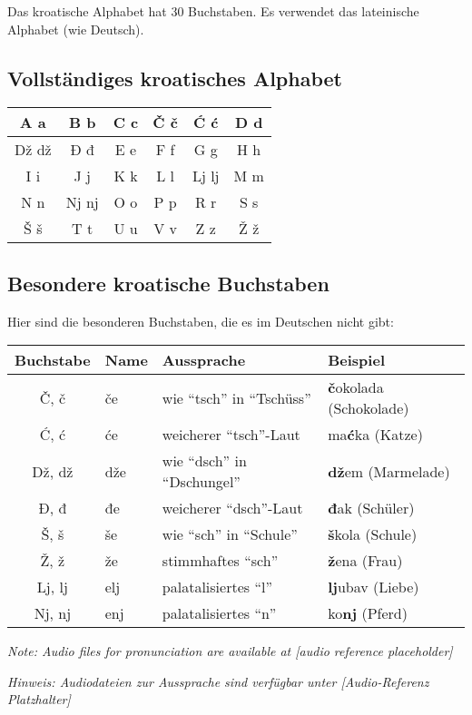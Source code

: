 \begin{vocabulary}
Das kroatische Alphabet hat 30 Buchstaben. Es verwendet das lateinische Alphabet (wie Deutsch).

\subsection*{Vollständiges kroatisches Alphabet}

\begin{center}
\begin{tabular}{|c|c|c|c|c|c|}
\hline
A a & B b & C c & Č č & Ć ć & D d \\
\hline
Dž dž & Đ đ & E e & F f & G g & H h \\
\hline
I i & J j & K k & L l & Lj lj & M m \\
\hline
N n & Nj nj & O o & P p & R r & S s \\
\hline
Š š & T t & U u & V v & Z z & Ž ž \\
\hline
\end{tabular}
\end{center}

\subsection*{Besondere kroatische Buchstaben}

Hier sind die besonderen Buchstaben, die es im Deutschen nicht gibt:

\begin{center}
\begin{tabular}{clll}
\toprule
Buchstabe & Name & Aussprache & Beispiel \\
\midrule
Č, č & če & wie ``tsch'' in ``Tschüss'' & \textbf{č}okolada (Schokolade) \\
Ć, ć & će & weicherer ``tsch''-Laut & ma\textbf{ć}ka (Katze) \\
Dž, dž & dže & wie ``dsch'' in ``Dschungel'' & \textbf{dž}em (Marmelade) \\
Đ, đ & đe & weicherer ``dsch''-Laut & \textbf{đ}ak (Schüler) \\
Š, š & še & wie ``sch'' in ``Schule'' & \textbf{š}kola (Schule) \\
Ž, ž & že & stimmhaftes ``sch'' & \textbf{ž}ena (Frau) \\
Lj, lj & elj & palatalisiertes ``l'' & \textbf{lj}ubav (Liebe) \\
Nj, nj & enj & palatalisiertes ``n'' & ko\textbf{nj} (Pferd) \\
\bottomrule
\end{tabular}
\end{center}

\textit{Note: Audio files for pronunciation are available at [audio reference placeholder]}

\textit{Hinweis: Audiodateien zur Aussprache sind verfügbar unter [Audio-Referenz Platzhalter]}
\end{vocabulary}

